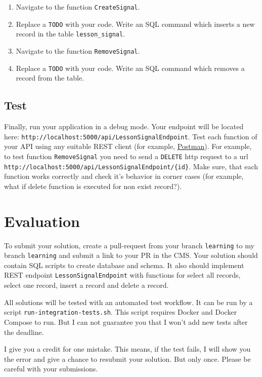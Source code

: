 \documentclass[12pt]{article}
\newcommand{\code}[1]{\texttt{#1}}
\begin{document}
\begin{enumerate}
\item Navigate to the function \code{CreateSignal}.
\item Replace a \code{TODO} with your code. Write an SQL command which inserts a new record in the table \code{lesson\_signal}.
\item Navigate to the function \code{RemoveSignal}.
\item Replace a \code{TODO} with your code. Write an SQL command which removes a record from the table.
\end{enumerate}

\subsection*{Test}

Finally, run your application in a debug mode. Your endpoint will be located here: \code{http://localhost:5000/api/LessonSignalEndpoint}. Test each function of your API using any suitable REST client (for example, \href{https://www.getpostman.com/}{Postman}). For example, to test function \code{RemoveSignal} you need to send a \code{DELETE} http request to a url \code{http://localhost:5000/api/LessonSignalEndpoint/\{id\}}. Make sure, that each function works correctly and check it's behavior in corner cases (for example, what if delete function is executed for non exist record?).

\section*{Evaluation}
To submit your solution, create a pull-request from your branch \code{learning} to my branch \code{learning} and submit a link to your PR in the CMS. Your solution should contain SQL scripts to create database and schema. It also should implement REST endpoint \code{LessonSignalEndpoint} with functions for select all records, select one record, insert a record and delete a record.

All solutions will be tested with an automated test workflow. It can be run by a script \code{run-integration-tests.sh}. This script requires Docker and Docker Compose to run. But I can not guarantee you that I won't add new tests after the deadline.

I give you a credit for one mistake. This means, if the test fails, I will show you the error and give a chance to resubmit your solution. But only once. Please be careful with your submissions.
\end{document}

